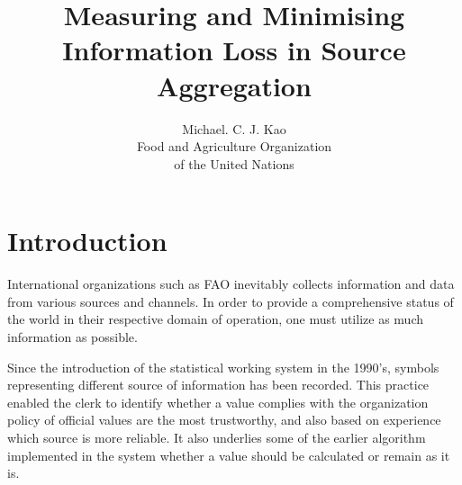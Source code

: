 \documentclass[nojss]{jss}
\title{\bf Measuring and Minimising Information Loss in Source Aggregation}
\author{Michael. C. J. Kao\\ Food and Agriculture Organization \\ of
  the United Nations}
\begin{document}
\section{Introduction}










International organizations such as FAO inevitably collects
information and data from various sources and channels. In order to
provide a comprehensive status of the world in their respective domain
of operation, one must utilize as much information as possible.


Since the introduction of the statistical working system in the
1990's, symbols representing different source of information has been
recorded. This practice enabled the clerk to identify whether a value
complies with the organization policy of official values are the most
trustworthy, and also based on experience which source is more
reliable. It also underlies some of the earlier algorithm implemented
in the system whether a value should be calculated or remain as it is.
\end{document}
